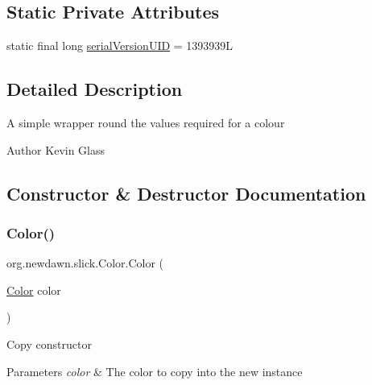 \subsection*{Static Private Attributes}
\begin{DoxyCompactItemize}
\item 
static final long \mbox{\hyperlink{classorg_1_1newdawn_1_1slick_1_1_color_ae51507267c35fa4e9ed98160c6e4a1ea}{serial\+Version\+U\+ID}} = 1393939L
\end{DoxyCompactItemize}


\subsection{Detailed Description}
A simple wrapper round the values required for a colour

\begin{DoxyAuthor}{Author}
Kevin Glass 
\end{DoxyAuthor}


\subsection{Constructor \& Destructor Documentation}
\mbox{\label{classorg_1_1newdawn_1_1slick_1_1_color_a39db992a7910141605cc2acb953c4917}} 
\subsubsection{\texorpdfstring{Color()}{Color()}\hspace{0.1cm}{\footnotesize\ttfamily [1/7]}}
{\footnotesize\ttfamily org.\+newdawn.\+slick.\+Color.\+Color (\begin{DoxyParamCaption}\item[{\mbox{\hyperlink{classorg_1_1newdawn_1_1slick_1_1_color}{Color}}}]{color }\end{DoxyParamCaption})\hspace{0.3cm}{\ttfamily [inline]}}

Copy constructor


\begin{DoxyParams}{Parameters}
{\em color} & The color to copy into the new instance \\
\hline
\end{DoxyParams}


